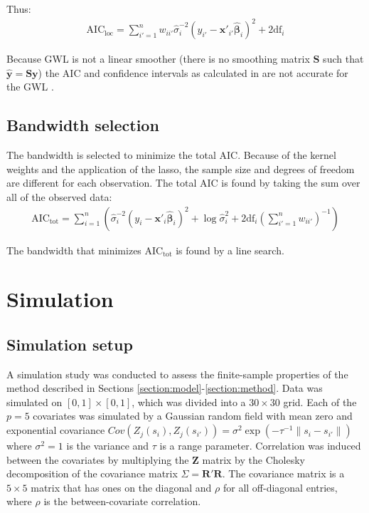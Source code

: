 \documentclass[authoryear, review, 11pt]{elsarticle}
\begin{document}
	Thus:
	\begin{eqnarray}
		\mbox{AIC}_{\mbox{loc}} = \sum_{i'=1}^n w_{ii'} \hat{\sigma}_i^{-2} \left( y_{i'} - \bm{x}'_{i'} \hat{\bm{\beta}}_i \right)^2 + 2 \mbox{df}_i
	\end{eqnarray}

	Because GWL is not a linear smoother (there is no smoothing matrix $\bm{S}$ such that $\hat{\bm{y}} = \bm{S} \bm{y}$) the AIC and confidence intervals as calculated in \cite{Fotheringham:2002} are not accurate for the GWL \citep{Zou:2006}.

	\subsection{Bandwidth selection}
		The bandwidth is selected to minimize the total AIC. Because of the kernel weights and the application of the lasso, the sample size and degrees of freedom are different for each observation. The total AIC is found by taking the sum over all of the observed data:		
		\begin{eqnarray}
			\mbox{AIC}_{\mbox{tot}} = \sum_{i=1}^n \left( \hat{\sigma}_i^{-2} \left( y_i - \bm{x}'_i \hat{\bm{\beta}}_i \right)^2 + \log \hat{\sigma}_i^2 + 2 \mbox{df}_i \left(\sum_{i'=1}^n w_{ii'} \right)^{-1} \right)
		\end{eqnarray}
			
			The bandwidth that minimizes $\mbox{AIC}_{\mbox{tot}}$ is found by a line search.\\
			
\section{Simulation}
	\subsection{Simulation setup}
		A simulation study was conducted to assess the finite-sample properties of the method described in Sections \ref{section:model}-\ref{section:method}. Data was simulated on $[0,1] \times [0,1]$, which was divided into a $30 \times 30$ grid. Each of the $p=5$ covariates was simulated by a Gaussian random field with mean zero and exponential covariance $Cov \left(Z_j(s_i), Z_j(s_{i'}) \right) = \sigma^2 \exp{\left( -\tau^{-1} \|s_i - s_{i'} \| \right)}$ where $\sigma^2=1$ is the variance and $\tau$ is a range parameter. Correlation was induced between the covariates by multiplying the $\bm{Z}$ matrix by the Cholesky decomposition of the covariance matrix $\Sigma = \bm{R}'\bm{R}$. The covariance matrix is a $5 \times 5$ matrix that has ones on the diagonal and $\rho$ for all off-diagonal entries, where $\rho$ is the between-covariate correlation.\\
		
\end{document}
